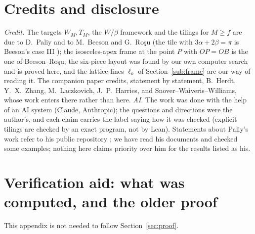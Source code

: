 \documentclass[11pt,reqno]{amsart}
\theoremstyle{plain}
\theoremstyle{definition}
\begin{document}
\section{Credits and disclosure}\label{sec:credit}
\emph{Credit.} The targets $W_M,T_M$, the $W/\beta$ framework and the tilings for $M\ge f$ are due to D.~Paliy and to M.~Beeson and G.~Ro\c{s}u (the tile with $3\alpha+2\beta=\pi$ is Beeson's case III \cite{BeesonIII}); the isosceles-apex frame at the point $P$ with $OP=OB$ is the one of Beeson--Ro\c{s}u; the six-piece layout was found by our own computer search and is proved here, and the lattice lines $\ell_k$ of Section~\ref{sub:frame} are our way of reading it. The companion paper \cite{Companion} credits, statement by statement, B.~Herdt, Y.~X.~Zhang, M.~Laczkovich, J.~P.~Harries, and Snover--Waiveris--Williams, whose work enters there rather than here.
\emph{AI.} The work was done with the help of an AI system (Claude, Anthropic); the questions and directions were the author's, and each claim carries the label saying how it was checked (explicit tilings are checked by an exact program, not by Lean).
Statements about Paliy's work refer to his public repository \cite{PaliyRepo}; we have read his documents and checked some examples; nothing here claims priority over him for the results listed as his.

\appendix
\section{Verification aid: what was computed, and the older proof}\label{app:checks}
This appendix is not needed to follow Section~\ref{sec:proof}.
\end{document}
